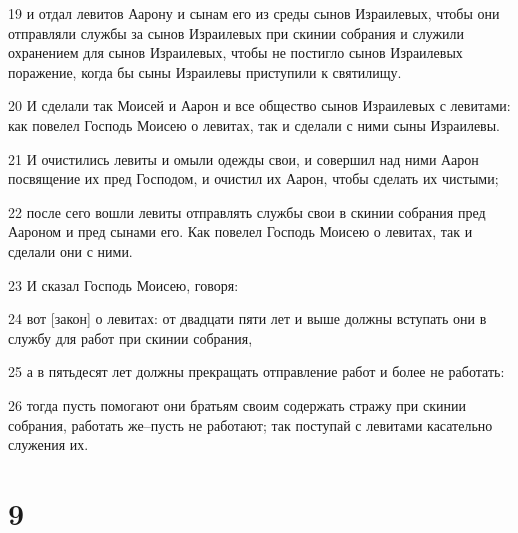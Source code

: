 \par 19 и отдал левитов Аарону и сынам его из среды сынов Израилевых, чтобы они отправляли службы за сынов Израилевых при скинии собрания и служили охранением для сынов Израилевых, чтобы не постигло сынов Израилевых поражение, когда бы сыны Израилевы приступили к святилищу.
\par 20 И сделали так Моисей и Аарон и все общество сынов Израилевых с левитами: как повелел Господь Моисею о левитах, так и сделали с ними сыны Израилевы.
\par 21 И очистились левиты и омыли одежды свои, и совершил над ними Аарон посвящение их пред Господом, и очистил их Аарон, чтобы сделать их чистыми;
\par 22 после сего вошли левиты отправлять службы свои в скинии собрания пред Аароном и пред сынами его. Как повелел Господь Моисею о левитах, так и сделали они с ними.
\par 23 И сказал Господь Моисею, говоря:
\par 24 вот [закон] о левитах: от двадцати пяти лет и выше должны вступать они в службу для работ при скинии собрания,
\par 25 а в пятьдесят лет должны прекращать отправление работ и более не работать:
\par 26 тогда пусть помогают они братьям своим содержать стражу при скинии собрания, работать же--пусть не работают; так поступай с левитами касательно служения их.

\chapter{9}

